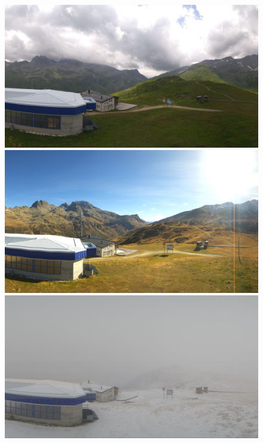 \documentclass[11pt]{article}
\begin{document}
    \begin{figure}[!htb]
            \includegraphics[width=\linewidth]{images/1_cloudy.jpg}
        \endminipage\hfill
            \includegraphics[width=\linewidth]{images/2_sunny.jpg}
        \endminipage\hfill
            \includegraphics[width=\linewidth]{images/3_snowy_foggy.jpg}
        \endminipage\hfill

\end{figure}
\end{document}
